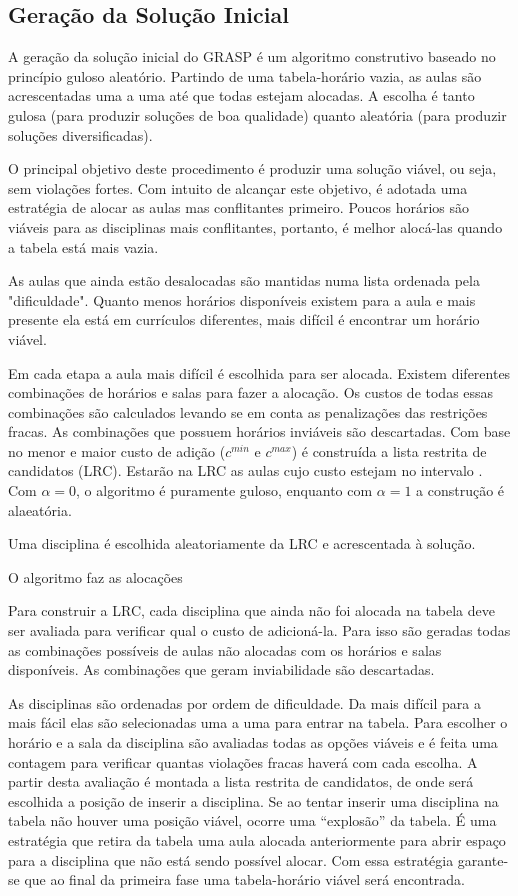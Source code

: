 \documentclass[11pt]{article}
\begin{document}
\subsection{Geração da Solução Inicial}

A geração da solução inicial do GRASP é um algoritmo construtivo baseado no princípio guloso aleatório. Partindo de uma tabela-horário vazia, as aulas são acrescentadas uma a uma até que todas estejam alocadas. A escolha é tanto gulosa (para produzir soluções de boa qualidade) quanto aleatória (para produzir soluções diversificadas).

O principal objetivo deste procedimento é produzir uma solução viável, ou seja, sem violações fortes. Com intuito de alcançar este objetivo, é adotada uma estratégia de alocar as aulas mas conflitantes primeiro. Poucos horários são viáveis para as disciplinas mais conflitantes, portanto, é melhor alocá-las quando a tabela está mais vazia.

As aulas que ainda estão desalocadas são mantidas numa lista ordenada pela "dificuldade". Quanto menos horários disponíveis existem para a aula e mais presente ela está em currículos diferentes, mais difícil é encontrar um horário viável.

Em cada etapa a aula mais difícil é escolhida para ser alocada. Existem diferentes combinações de horários e salas para fazer a alocação. Os custos de todas essas combinações são calculados levando se em conta as penalizações das restrições fracas. As combinações que possuem horários inviáveis são descartadas. Com base no menor e maior custo de adição ($c^{min}$ e $c^{max}$) é construída a lista restrita de candidatos (LRC). Estarão na LRC as aulas cujo custo estejam no intervalo \begin{math} [c^{min}, c^{min}+\alpha(c^{max} - c^{min})]\end{math}. Com $\alpha=0$, o algoritmo é puramente guloso, enquanto com $\alpha=1$ a construção é alaeatória.

Uma disciplina é escolhida aleatoriamente da LRC e acrescentada à solução.

O algoritmo faz as alocações 

Para construir a LRC, cada disciplina que ainda não foi alocada na tabela deve ser avaliada para verificar qual o custo de adicioná-la. Para isso são geradas todas as combinações possíveis de aulas não alocadas com os horários e salas disponíveis. As combinações que geram inviabilidade são descartadas. 

As disciplinas são ordenadas por ordem de dificuldade. Da mais difícil para a mais fácil elas são selecionadas uma a uma para entrar na tabela. Para escolher o horário e a sala da disciplina são avaliadas todas as opções viáveis e é feita uma contagem para verificar quantas violações fracas haverá com cada escolha. A partir desta avaliação é montada a lista restrita de candidatos, de onde será escolhida a posição de inserir a disciplina. Se ao tentar inserir uma disciplina na tabela não houver uma posição viável, ocorre uma “explosão” da tabela. É uma estratégia que retira da tabela uma aula alocada anteriormente para abrir espaço para a disciplina que não está sendo possível alocar. Com essa estratégia garante-se que ao final da primeira fase uma tabela-horário viável será encontrada. 
\end{document}
